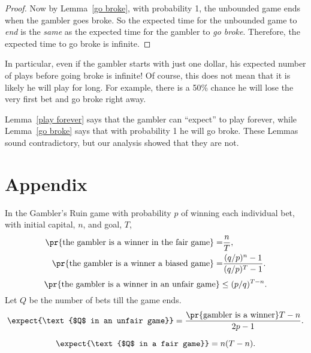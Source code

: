 \begin{problem}
{\begin{proof}
Now by Lemma~\ref{go broke}, with probability 1, the unbounded game ends
when the gambler goes broke.  So the expected time for the unbounded game
to \emph{end} is the \emph{same} as the expected time for the gambler to
\emph{go broke}.  Therefore, the expected time to go broke is infinite.
\end{proof}

In particular, even if the gambler starts with just one dollar, his
expected number of plays before going broke is infinite!  Of course, this
does not mean that it is likely he will play for long.  For example, there
is a 50\% chance he will lose the very first bet and go broke right away.

Lemma~\ref{play forever} says that the gambler can ``expect'' to play
forever, while Lemma~\ref{go broke} says that with probability 1 he will
go broke.  These Lemmas sound contradictory, but our analysis showed that
they are not.
}
\end{problem}


\appendix
\section{Appendix}

\begin{theorem*}
In the Gambler's Ruin game with probability $p$ of winning
each individual bet, with initial capital, $n$, and goal, $T$,
\begin{align}
\pr{\text{the gambler is a winner in the fair game}} = & \frac{n}{T},
        \label{fairwin}\\
\pr{\text{the gambler is a winner a biased game}} = &
        \frac{(q/p)^n-1}{(q/p)^T -1}. \label{biaswin}
\end{align}
\begin{equation}\label{intended-profit}
\pr{\text{the gambler is a winner in an unfair game}} \leq (p/q)^{T-n}.
\end{equation}
Let $Q$ be the number of bets till the game ends.
\[
\expect{\text{$Q$ in an unfair game}} =
\frac{\pr{\text{gambler is a winner}}T-n}{2p-1}.
\]

\begin{equation}
\label{Tn}
\expect{\text{$Q$ in a fair game}} = n(T-n).
\end{equation}

\end{theorem*}





